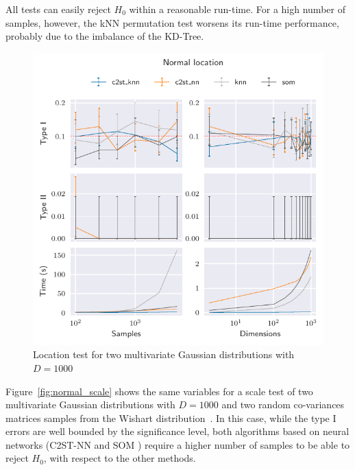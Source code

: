 All tests can easily reject $H_0$ within a reasonable run-time. For
a high number of samples, however, the \gls{kNN} permutation test worsens its run-time performance,
probably due to the imbalance of the KD-Tree.

\begin{figure}[htpb]
    \centering
    \includegraphics{images/6_som/normal_location}
    \caption{
    Location test for two multivariate Gaussian distributions with $D=1000$
    }
    \label{fig:normal_location}
\end{figure}

Figure~\ref{fig:normal_scale} shows the same variables for a scale test of two multivariate
Gaussian distributions with $D=1000$ and two random co-variances matrices samples from the
Wishart distribution~\cite{smith1972algorithm}. In this case, while the type I errors are
well bounded by the significance level, both algorithms based on neural networks
(C2ST-NN and \gls{SOM} ) require a higher number of samples to be able to reject $H_0$, with respect
to the other methods.

